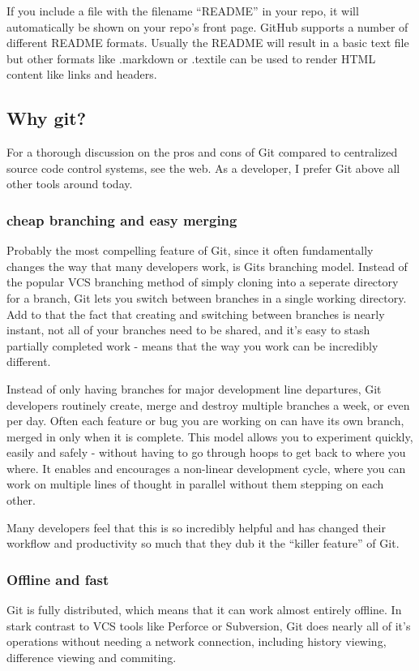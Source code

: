 If you include a file with the filename “README” in your repo, it will
automatically be shown on your repo’s front page. GitHub supports a number of
different README formats. Usually the README will result in a basic text
file but other formats like .markdown or .textile can be used to render HTML
content like links and headers.

\subsection{Why git?}
For a thorough discussion on the pros and cons of Git compared to centralized
source code control systems, see the web. As a developer, I prefer Git above all
other tools around today.

\subsubsection{cheap branching and easy merging}
Probably the most compelling feature of Git, since it often fundamentally changes
the way that many developers work, is Gits branching model. Instead of the
popular VCS branching method of simply cloning into a seperate directory for a
branch, Git lets you switch between branches in a single working directory. Add
to that the fact that creating and switching between branches is nearly instant,
not all of your branches need to be shared, and it’s easy to stash partially
completed work - means that the way you work can be incredibly different.

Instead of only having branches for major development line departures, Git
developers routinely create, merge and destroy multiple branches a week, or even
per day. Often each feature or bug you are working on can have its own branch,
merged in only when it is complete. This model allows you to experiment quickly,
easily and safely - without having to go through hoops to get back to where you
where. It enables and encourages a non-linear development cycle, where you can
work on multiple lines of thought in parallel without them stepping on each
other.

Many developers feel that this is so incredibly helpful and has changed their
workflow and productivity so much that they dub it the “killer feature” of Git.

\subsubsection{Offline and fast}
Git is fully distributed, which means that it can work almost entirely offline.
In stark contrast to VCS tools like Perforce or Subversion, Git does nearly all
of it’s operations without needing a network connection, including history
viewing, difference viewing and commiting.

